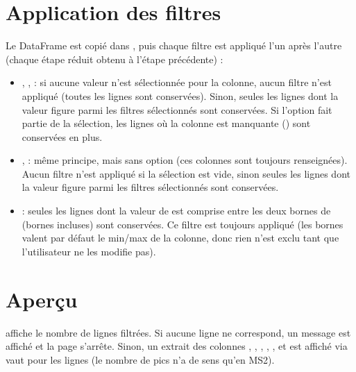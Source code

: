 \documentclass[letterpaper,10pt,english]{sphinxmanual}
\begin{document}
\section{Application des filtres}
\label{\detokenize{3_Export:application-des-filtres}}
\sphinxAtStartPar
Le DataFrame  est copié dans , puis chaque filtre est appliqué
l’un après l’autre (chaque étape réduit  obtenu à l’étape précédente) :
\begin{itemize}
\item {} 
\sphinxAtStartPar
{}, ,  : si aucune valeur n’est
sélectionnée pour la colonne, aucun filtre n’est appliqué (toutes les lignes sont
conservées). Sinon, seules les lignes dont la valeur figure parmi les filtres sélectionnés
sont conservées. Si l’option  fait partie de la sélection, les lignes où la
colonne est manquante () sont conservées en plus.

\item {} 
\sphinxAtStartPar
{},  : même principe, mais sans option  (ces
colonnes sont toujours renseignées). Aucun filtre n’est appliqué si la sélection est vide,
sinon seules les lignes dont la valeur figure parmi les filtres sélectionnés sont conservées.

\item {} 
\sphinxAtStartPar
{} : seules les lignes dont la valeur de  est comprise entre les deux bornes
de  (bornes incluses) sont conservées. Ce filtre est toujours appliqué
(les bornes valent par défaut le min/max de la colonne, donc rien n’est exclu tant que
l’utilisateur ne les modifie pas).

\end{itemize}


\section{Aperçu}
\label{\detokenize{3_Export:apercu}}
\sphinxAtStartPar
{} affiche le nombre de lignes filtrées. Si aucune ligne ne correspond,
un message  est affiché et la page s’arrête. Sinon, un extrait des colonnes
, , , , ,  et  est affiché
via  vaut  pour les lignes  (le nombre de pics n’a de sens qu’en MS2).
\end{document}
